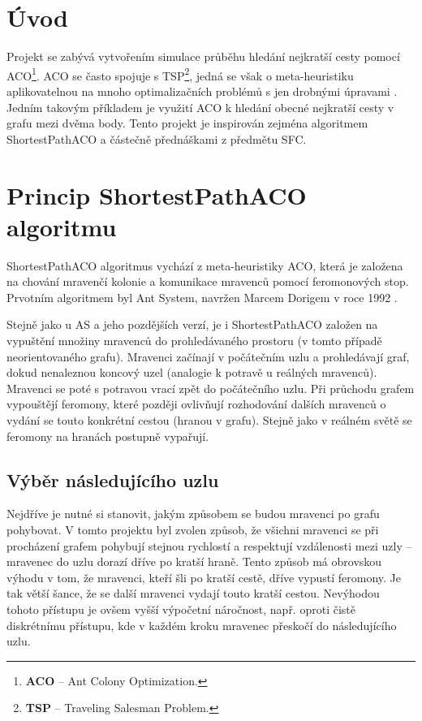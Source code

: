 \documentclass[12pt]{article}
\begin{document}
\afterpage{\cfoot{\thepage }}
\section{Úvod}
Projekt se zabývá vytvořením simulace průběhu hledání nejkratší cesty pomocí ACO\footnote{\textbf{ACO} -- Ant Colony Optimization.}. ACO se často spojuje s TSP\footnote{\textbf{TSP} -- Traveling Salesman Problem.}, jedná se však o meta-heuristiku aplikovatelnou na mnoho optimalizačních problémů s jen drobnými úpravami \cite{dorigo2006ant}. Jedním takovým příkladem je využití ACO k hledání obecné nejkratší cesty v grafu mezi dvěma body. Tento projekt je inspirován zejména algoritmem ShortestPathACO \cite{glabowski2012shortest} a částečně přednáškami z předmětu SFC.

\section{Princip ShortestPathACO algoritmu}
ShortestPathACO algoritmus vychází z meta-heuristiky ACO, která je založena na chování mravenčí kolonie a komunikace mravenců pomocí feromonových stop. Prvotním algoritmem byl Ant System, navržen Marcem Dorigem v roce 1992 \cite{dorigo1996ant}. 

Stejně jako u AS a jeho pozdějších verzí, je i ShortestPathACO založen na vypuštění množiny mravenců do prohledávaného prostoru (v tomto případě neorientovaného grafu). Mravenci začínají v počátečním uzlu a prohledávají graf, dokud nenaleznou koncový uzel (analogie k potravě u reálných mravenců). Mravenci se poté s potravou vrací zpět do počátečního uzlu. Při průchodu grafem vypouštějí feromony, které později ovlivňují rozhodování dalších mravenců o vydání se touto konkrétní cestou (hranou v grafu). Stejně jako v reálném světě se feromony na hranách postupně vypařují.

\subsection{Výběr následujícího uzlu}
\label{next}
Nejdříve je nutné si stanovit, jakým způsobem se budou mravenci po grafu pohybovat. V tomto projektu byl zvolen způsob, že všichni mravenci se při procházení grafem pohybují stejnou rychlostí a respektují vzdálenosti mezi uzly -- mravenec do uzlu dorazí dříve po kratší hraně. Tento způsob má obrovskou výhodu v tom, že mravenci, kteří šli po kratší cestě, dříve vypustí feromony. Je tak větší šance, že se další mravenci vydají touto kratší cestou. Nevýhodou tohoto přístupu je ovšem vyšší výpočetní náročnost, např. oproti čistě diskrétnímu přístupu, kde v každém kroku mravenec přeskočí do následujícího uzlu.
\end{document}
